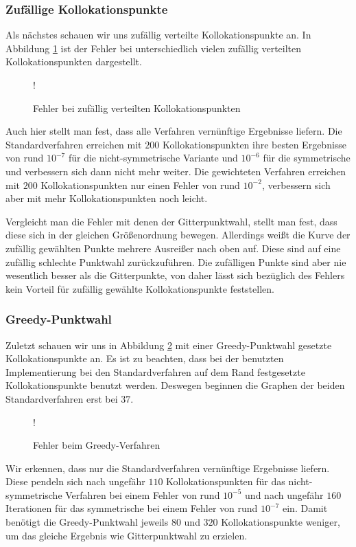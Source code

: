 \subsubsection{Zufällige Kollokationspunkte}
Als nächstes schauen wir uns zufällig verteilte Kollokationspunkte an. In Abbildung \ref{fig:error-random} ist der Fehler bei unterschiedlich vielen zufällig verteilten Kollokationspunkten dargestellt.
\begin{figure}[ht]
\centering
\resizebox {\columnwidth} {!} {

}
\caption{Fehler bei zufällig verteilten Kollokationspunkten}
\label{fig:error-random}
\end{figure}

Auch hier stellt man fest, dass alle Verfahren vernünftige Ergebnisse liefern. Die Standardverfahren erreichen mit $200$ Kollokationspunkten ihre besten Ergebnisse von rund $10^{-7}$ für die nicht-symmetrische Variante und $10^{-6}$ für die symmetrische und verbessern sich dann nicht mehr weiter. Die gewichteten Verfahren erreichen mit $200$ Kollokationspunkten nur einen Fehler von rund $10^{-2}$, verbessern sich aber mit mehr Kollokationspunkten noch leicht.

Vergleicht man die Fehler mit denen der Gitterpunktwahl, stellt man fest, dass diese sich in der gleichen Größenordnung bewegen. Allerdings weißt die Kurve der zufällig gewählten Punkte mehrere Ausreißer nach oben auf. Diese sind auf eine zufällig schlechte Punktwahl zurückzuführen. Die zufälligen Punkte sind aber nie wesentlich besser als die Gitterpunkte, von daher lässt sich bezüglich des Fehlers kein Vorteil für zufällig gewählte Kollokationspunkte feststellen.

\subsubsection{Greedy-Punktwahl}
Zuletzt schauen wir uns in Abbildung \ref{fig:error-greedy} mit einer Greedy-Punktwahl gesetzte Kollokationspunkte an. Es ist zu beachten, dass bei der benutzten Implementierung bei den Standardverfahren auf dem Rand festgesetzte Kollokationspunkte benutzt werden. Deswegen beginnen die Graphen der beiden Standardverfahren erst bei $37$.
\begin{figure}[ht]
\centering
\resizebox {\columnwidth} {!} {

}
\caption{Fehler beim Greedy-Verfahren}
\label{fig:error-greedy}
\end{figure}

Wir erkennen, dass nur die Standardverfahren vernünftige Ergebnisse liefern. Diese pendeln sich nach ungefähr $110$ Kollokationspunkten für das nicht-symmetrische Verfahren bei einem Fehler von rund $10^{-5}$ und nach ungefähr $160$ Iterationen für das symmetrische bei einem Fehler von rund $10^{-7}$ ein. Damit benötigt die Greedy-Punktwahl jeweils $80$ und $320$ Kollokationspunkte weniger, um das gleiche Ergebnis wie Gitterpunktwahl zu erzielen.

